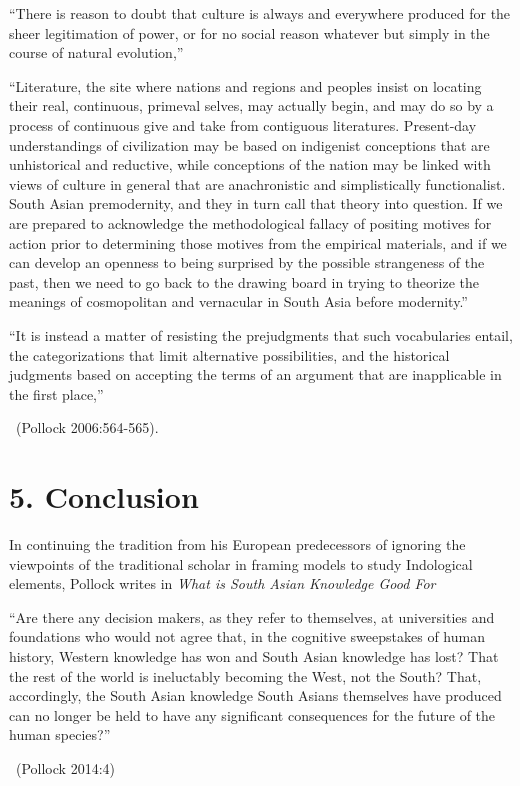 \begin{myquote}
“There is reason to doubt that culture is always and everywhere produced for the sheer legitimation of power, or for no social reason whatever but simply in the course of natural evolution,”

“Literature, the site where nations and regions and peoples insist on locating their real, continuous, primeval selves, may actually begin, and may do so by a process of continuous give and take from contiguous literatures. Present-day understandings of civilization may be based on indigenist conceptions that are unhistorical and reductive, while conceptions of the nation may be linked with views of culture in general that are anachronistic and simplistically functionalist. South Asian premodernity, and they in turn call that theory into question. If we are prepared to acknowledge the methodological fallacy of positing motives for action prior to determining those motives from the empirical materials, and if we can develop an openness to being surprised by the possible strangeness of the past, then we need to go back to the drawing board in trying to theorize the meanings of cosmopolitan and vernacular in South Asia before modernity.”

“It is instead a matter of resisting the prejudgments that such vocabularies entail, the categorizations that limit alternative possibilities, and the historical judgments based on accepting the terms of an argument that are inapplicable in the first place,” 

~\hfill (Pollock 2006:564-565).
\end{myquote}


\section*{5. Conclusion}

In continuing the tradition from his European predecessors of ignoring the viewpoints of the traditional scholar in framing models to study Indological elements, Pollock writes in \textit{What is South Asian Knowledge Good For}

\begin{myquote}
“Are there any decision makers, as they refer to themselves, at universities and foundations who would not agree that, in the cognitive sweepstakes of human history, Western knowledge has won and South Asian knowledge has lost? That the rest of the world is ineluctably becoming the West, not the South? That, accordingly, the South Asian knowledge South Asians themselves have produced can no longer be held to have any significant consequences for the future of the human species?” 

~\hfill (Pollock 2014:4)
\end{myquote}

